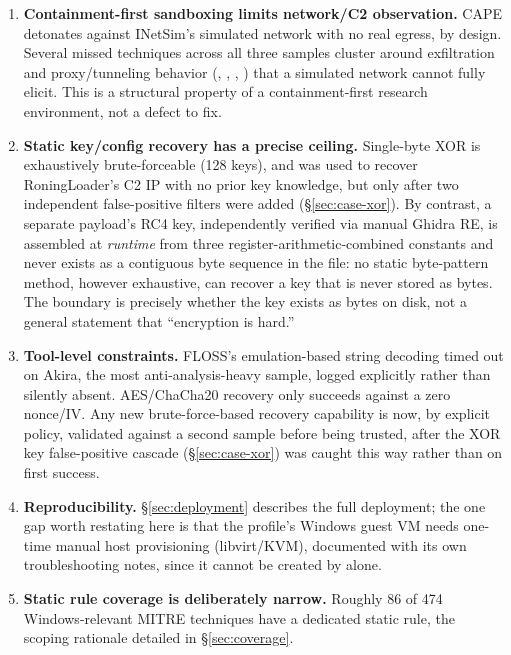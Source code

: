 \begin{enumerate}
\item \label{lim:containment} \textbf{Containment-first sandboxing
  limits network/C2 observation.} CAPE detonates against INetSim's simulated network with
  no real egress, by design. Several missed techniques across all three
  samples cluster around exfiltration and proxy/tunneling behavior
  (, , ,
  ) that a simulated network cannot fully elicit. This
  is a structural property of a containment-first research environment,
  not a defect to fix.

\item \label{lim:key-ceiling} \textbf{Static key/config recovery has a
  precise ceiling.}
  Single-byte XOR is exhaustively brute-forceable (128 keys), and was
  used to recover RoningLoader's C2 IP with no prior key knowledge, but
  only after two independent false-positive filters were added
  (\S\ref{sec:case-xor}). By contrast, a separate payload's RC4 key,
  independently verified via manual Ghidra RE, is assembled at
  \emph{runtime} from three register-arithmetic-combined constants and
  never exists as a contiguous byte sequence in the file: no static
  byte-pattern method, however exhaustive, can recover a key that is
  never stored as bytes. The boundary is precisely whether the key
  exists as bytes on disk, not a general statement that ``encryption is
  hard.''

\item \label{lim:tool-constraints} \textbf{Tool-level constraints.} FLOSS's emulation-based string
  decoding timed out on Akira, the most anti-analysis-heavy sample,
  logged explicitly rather than silently absent. AES/ChaCha20 recovery
  only succeeds against a zero nonce/IV. Any new brute-force-based
  recovery capability is now, by explicit policy, validated against a
  second sample before being trusted, after the XOR key false-positive
  cascade (\S\ref{sec:case-xor}) was caught this way rather than on
  first success.

\item \label{lim:reproducibility} \textbf{Reproducibility.} \S\ref{sec:deployment} describes the
  full  deployment; the one gap worth restating
  here is that the  profile's Windows guest VM needs
  one-time manual host provisioning (libvirt/KVM), documented with its
  own troubleshooting notes, since it cannot be created by
   alone.

\item \label{lim:rule-coverage} \textbf{Static rule coverage is
  deliberately narrow.} Roughly 86
  of 474 Windows-relevant MITRE techniques have a dedicated static
  rule, the scoping rationale detailed in \S\ref{sec:coverage}.


\end{enumerate}

